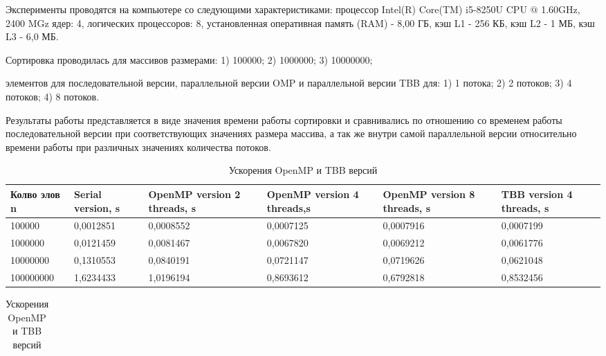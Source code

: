 \documentclass[a4paper,final]{report}
\begin{document}
\begin{spacing}{1.5}
		\par Эксперименты проводятся на компьютере со следующими характеристиками: процессор	Intel(R) Core(TM) i5-8250U CPU $@$ 1.60GHz, 2400 MGz ядер: 4, логических процессоров: 8, установленная оперативная память (RAM) - 8,00 ГБ, кэш L1 - 256 КБ, кэш L2 - 1 МБ, кэш L3 - 6,0 МБ. 
		\par Сортировка проводилась для массивов размерами: 
              1) 100000; 2) 1000000; 3) 10000000; 
		\par элементов для последовательной версии, параллельной версии OMP и параллельной версии TBB для: 
        1) 1 потока; 2) 2 потоков; 3) 4 потоков; 4) 8 потоков. 
        \par Результаты работы представляется в виде значения времени работы сортировки и сравнивались по отношению со временем работы последовательной версии при соответствующих значениях размера массива, а так же внутри самой параллельной версии относительно времени работы при различных значениях количества потоков. 
			\begin{table}[ht!]
			\caption{Ускорения OpenMP и TBB версий}
			\centering
			\begin{tabular}{|p{2.2cm}|p{2.4cm}|p{2.5cm}|p{2.6cm}|p{2.6cm}|p{2.1cm}|}
				\hline
				
				Кол\-во эл\-ов n & Serial version, s & OpenMP version 2 threads, s & OpenMP version 4 threads,s & OpenMP version 8 threads, s & TBB version 4 threads, s \\ \hline
				
		        100000 & 0,0012851 & 0,0008552 & 0,0007125 & 0,0007916 & 0,0007199 \\ \hline
				
		        1000000 & 0,0121459 & 0,0081467 & 0,0067820 & 0,0069212 & 0,0061776 \\ \hline
				
	        	10000000 & 0,1310553 & 0,0840191 & 0,0721147 & 0,0719626 & 0,0621048 \\ \hline
	        	
				100000000 & 1,6234433 & 1,0196194 & 0,8693612 & 0,6792818 & 0,8532456 \\ \hline
				
			\end{tabular}
		\end{table}
		
		\begin{table}[ht!]
			\caption{Ускорения OpenMP и TBB версий}
			\centering
			\begin{tabular}{|p{2.8cm}|p{3.1cm}|p{3.1cm}|p{3.1cm}|p{2.8cm}|}
				\hline
				

\end{tabular}
\end{table}
\end{spacing}
\end{document}

